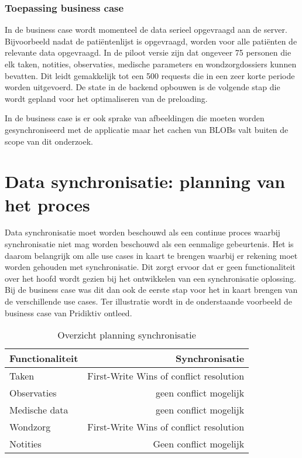 \subsubsection{Toepassing business case}
In de business case wordt momenteel de data serieel opgevraagd aan de server. Bijvoorbeeld nadat de pati\"entenlijst is opgevraagd, worden voor alle pati\"enten de relevante data opgevraagd. In de piloot versie zijn dat ongeveer 75 personen die elk taken, notities, observaties, medische parameters en wondzorgdossiers kunnen bevatten. Dit leidt gemakkelijk tot een 500 requests die in een zeer korte periode worden uitgevoerd. De state in de backend opbouwen is de volgende stap die wordt gepland voor het optimaliseren van de preloading. 

In de business case is er ook sprake van afbeeldingen die moeten worden gesynchroniseerd met de applicatie maar het cachen van BLOBs valt buiten de scope van dit onderzoek.

\section{Data synchronisatie: planning van het proces}
Data synchronisatie moet worden beschouwd als een continue proces\autocite{data-integration-steps} waarbij synchronisatie niet mag worden beschouwd als een eenmalige gebeurtenis. Het is daarom belangrijk om alle use cases in kaart te brengen waarbij er rekening moet worden gehouden met synchronisatie. Dit zorgt ervoor dat er geen functionaliteit over het hoofd wordt gezien bij het ontwikkelen van een synchronisatie oplossing. 
\clearpage
Bij de business case was dit dan ook de eerste stap voor het in kaart brengen van de verschillende use cases. Ter illustratie wordt in de onderstaande voorbeeld de business case van Pridiktiv ontleed.

\begin{table}[htp]
\caption{Overzicht planning synchronisatie}
\begin{center}
\begin{tabular}{ l | r }
\hline
Functionaliteit & Synchronisatie \\ \hline
   Taken & First-Write Wins of conflict resolution \\
   Observaties & geen conflict mogelijk \\
   Medische data & geen conflict mogelijk \\
   Wondzorg & First-Write Wins of conflict resolution \\
   Notities & Geen conflict mogelijk \\
   \hline
\end{tabular}
\end{center}
\label{default}
\end{table}%


